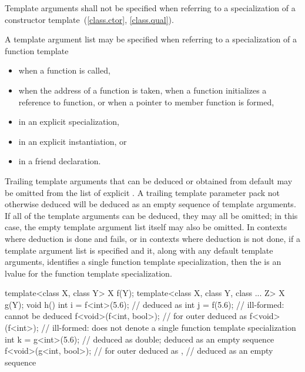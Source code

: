 \pnum
Template arguments shall not be specified
when referring to a specialization of
a constructor template~(\ref{class.ctor}, \ref{class.qual}).

\pnum
A template argument list may be specified when referring to a specialization
of a function template
\begin{itemize}
\item
when a function is called,
\item
when the address of a function is taken, when a function initializes a
reference to function, or when a pointer to member function is formed,
\item
in an explicit specialization,
\item
in an explicit instantiation, or
\item
in a friend declaration.
\end{itemize}

\pnum
Trailing template arguments that can be deduced or
obtained from default
may be omitted from the list of explicit
.
A trailing template parameter pack not otherwise deduced will be
deduced as an empty sequence of template arguments.
If all of the template arguments can be deduced, they may all be omitted;
in this case, the empty template argument list
\tcode{<>}
itself may also be omitted.
In contexts where deduction is done and fails, or in contexts where
deduction is not done, if a template argument list is specified and it,
along with any default template arguments, identifies a single function
template specialization, then the
is an lvalue for the function template specialization.
\begin{example}
\begin{codeblock}
template<class X, class Y> X f(Y);
template<class X, class Y, class ... Z> X g(Y);
void h() {
  int i = f<int>(5.6);          //  deduced as 
  int j = f(5.6);               // ill-formed:  cannot be deduced
  f<void>(f<int, bool>);        //  for outer  deduced as 
  f<void>(f<int>);              // ill-formed:  does not denote a single function template specialization
  int k = g<int>(5.6);          //  deduced as double;  deduced as an empty sequence
  f<void>(g<int, bool>);        //  for outer  deduced as ,
                                //  deduced as an empty sequence
}
\end{codeblock}
\end{example}

